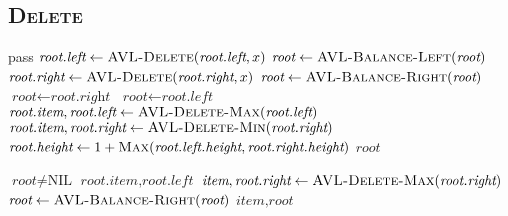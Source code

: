 \subsection{\textsc{Delete}}

\begin{algorithm}[H] \begin{algorithmic}
        \State {}
            \State pass 
            \State $\textit{root.left} \gets \textsc{AVL-Delete}(\textit{root.left}, x)$
            \State $\textit{root} \gets \textsc{AVL-Balance-Left}(\textit{root})$
            \State $\textit{root.right} \gets \textsc{AVL-Delete}(\textit{root.right}, x)$
            \State $\textit{root} \gets \textsc{AVL-Balance-Right}(\textit{root})$
        \Else {~} 
                \State $\textit{root} \gets \textit{root.right}$ 
                \State $\textit{root} \gets \textit{root.left}$
            \Else 
                    \State $\textit{root.item}, \textit{root.left} \gets \textsc{AVL-Delete-Max}(\textit{root.left})$
                \Else
                    \State $\textit{root.item}, \textit{root.right} \gets \textsc{AVL-Delete-Min}(\textit{root.right})$
                \EndIf
            \EndIf
            \State $\textit{root.height} \gets 1 + \textsc{Max}(\textit{root.left.height}, \textit{root.right.height})$
        \EndIf
        \State \Return $\textit{root}$
    \EndProcedure
\end{algorithmic} \end{algorithm}

\begin{algorithm}[H] \begin{algorithmic}
        \State {}
        \Require $\textit{root} \neq \text{NIL}$
            \State \Return $\textit{root.item}, \textit{root.left}$
        \Else
            \State $\textit{item}, \textit{root.right} \gets \textsc{AVL-Delete-Max}(\textit{root.right})$
            \State $\textit{root} \gets \textsc{AVL-Balance-Right}(\textit{root})$
            \State \Return $\textit{item}, \textit{root}$
        \EndIf
    \EndProcedure
\end{algorithmic} \end{algorithm}

